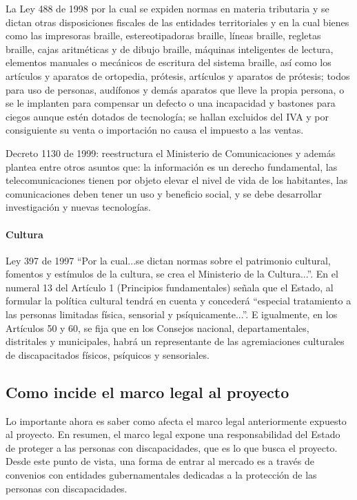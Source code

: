 \documentclass[a4paper, 12pt, oneside]{article}
\begin{document}
	La Ley 488 de 1998 por la cual se expiden normas en materia tributaria y se dictan otras disposiciones fiscales de las entidades territoriales y en la cual bienes como las impresoras braille, estereotipadoras braille, líneas braille, regletas braille, cajas aritméticas y de dibujo braille, máquinas inteligentes de lectura, elementos manuales o mecánicos de escritura del sistema braille, así como los artículos y aparatos de ortopedia, prótesis, artículos y aparatos de prótesis; todos para uso de personas, audífonos y demás aparatos que lleve la propia persona, o se le implanten para compensar un defecto o una incapacidad y bastones para ciegos aunque estén dotados de tecnología; se hallan excluidos del IVA y por consiguiente su venta o importación no causa el impuesto a las ventas. 

	Decreto 1130 de 1999: reestructura el Ministerio de Comunicaciones y además plantea entre otros asuntos que: la información es un derecho fundamental, las telecomunicaciones tienen por objeto elevar el nivel de vida de los habitantes, las comunicaciones deben tener un uso y beneficio social, y se debe desarrollar investigación y nuevas tecnologías.

	\paragraph{Cultura}

	Ley 397 de 1997 “Por la cual...se dictan normas sobre el patrimonio cultural, fomentos y estímulos de la cultura, se crea el Ministerio de la Cultura...”. En el numeral 13 del Artículo 1 (Principios fundamentales) señala que el Estado, al formular la política cultural tendrá en cuenta y concederá “especial tratamiento a las personas limitadas física, sensorial y psíquicamente...”. E igualmente, en los Artículos 50 y 60, se fija que en los Consejos nacional, departamentales, distritales y municipales, habrá un representante de las agremiaciones culturales de discapacitados físicos, psíquicos y sensoriales.	
	
	\subsection{Como incide el marco legal al proyecto}
	Lo importante ahora es saber como afecta el marco legal anteriormente expuesto al proyecto. En resumen, el marco legal expone una responsabilidad del Estado de proteger a las personas con discapacidades, que es lo que busca el proyecto. Desde este punto de vista, una forma de entrar al mercado es a través de convenios con entidades gubernamentales dedicadas a la protección de las personas con discapacidades.
	
\end{document}

